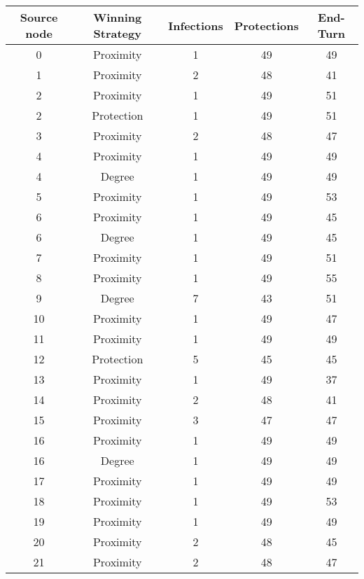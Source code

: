 \documentclass[results.tex]{subfiles}
\begin{document}
\begin{center}
  \begin{tabular}{| c || c | c | c | c |}
    \hline
    {\bfseries Source node} & {\bfseries Winning Strategy} & {\bfseries Infections} & {\bfseries Protections} & {\bfseries End-Turn} \\  %
    \hline\hline
    0 & Proximity & 1 & 49 & 49 \\ 
    \hline
    1 & Proximity & 2 & 48 & 41 \\ 
    \hline
    2 & Proximity & 1 & 49 & 51 \\ 
    \hline
    2 & Protection & 1 & 49 & 51 \\ 
    \hline
    3 & Proximity & 2 & 48 & 47 \\ 
    \hline
    4 & Proximity & 1 & 49 & 49 \\ 
    \hline
    4 & Degree & 1 & 49 & 49 \\ 
    \hline
    5 & Proximity & 1 & 49 & 53 \\ 
    \hline
    6 & Proximity & 1 & 49 & 45 \\ 
    \hline
    6 & Degree & 1 & 49 & 45 \\ 
    \hline
    7 & Proximity & 1 & 49 & 51 \\ 
    \hline
    8 & Proximity & 1 & 49 & 55 \\ 
    \hline
    9 & Degree & 7 & 43 & 51 \\ 
    \hline
    10 & Proximity & 1 & 49 & 47 \\ 
    \hline
    11 & Proximity & 1 & 49 & 49 \\ 
    \hline
    12 & Protection & 5 & 45 & 45 \\ 
    \hline
    13 & Proximity & 1 & 49 & 37 \\ 
    \hline
    14 & Proximity & 2 & 48 & 41 \\ 
    \hline
    15 & Proximity & 3 & 47 & 47 \\ 
    \hline
    16 & Proximity & 1 & 49 & 49 \\ 
    \hline
    16 & Degree & 1 & 49 & 49 \\ 
    \hline
    17 & Proximity & 1 & 49 & 49 \\ 
    \hline
    18 & Proximity & 1 & 49 & 53 \\ 
    \hline
    19 & Proximity & 1 & 49 & 49 \\ 
    \hline
    20 & Proximity & 2 & 48 & 45 \\ 
    \hline
    21 & Proximity & 2 & 48 & 47 \\ 

\end{tabular}
\end{center}
\end{document}

